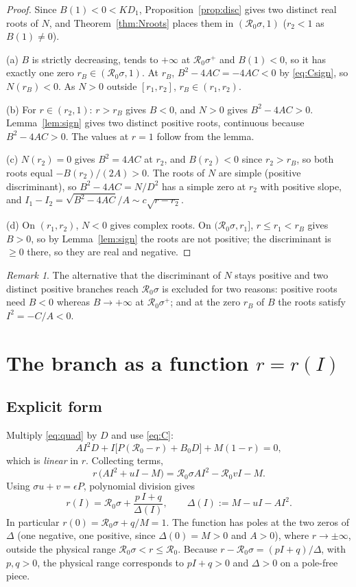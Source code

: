 \documentclass[11pt]{article}
\theoremstyle{remark}
\newtheorem{remark}[lemma]{Remark}
\newcommand{\R}{\mathcal R_0}
\begin{document}
\begin{proof}
Since $B(1)<0<KD_1$, Proposition~\ref{prop:disc} gives two distinct real roots of $N$, and Theorem~\ref{thm:Nroots} places them in $(\R\sigma,1)$ ($r_2<1$ as $B(1)\ne0$).

(a) $B$ is strictly decreasing, tends to $+\infty$ at $\R\sigma^+$ and $B(1)<0$, so it has exactly one zero $r_B\in(\R\sigma,1)$. At $r_B$, $B^2-4AC=-4AC<0$ by \eqref{eq:Csign}, so $N(r_B)<0$. As $N>0$ outside $[r_1,r_2]$, $r_B\in(r_1,r_2)$.

(b) For $r\in(r_2,1)$: $r>r_B$ gives $B<0$, and $N>0$ gives $B^2-4AC>0$. Lemma~\ref{lem:sign} gives two distinct positive roots, continuous because $B^2-4AC>0$. The values at $r=1$ follow from the lemma.

(c) $N(r_2)=0$ gives $B^2=4AC$ at $r_2$, and $B(r_2)<0$ since $r_2>r_B$, so both roots equal $-B(r_2)/(2A)>0$. The roots of $N$ are simple (positive discriminant), so $B^2-4AC=N/D^2$ has a simple zero at $r_2$ with positive slope, and $I_1-I_2=\sqrt{B^2-4AC}/A\sim c\sqrt{r-r_2}$.

(d) On $(r_1,r_2)$, $N<0$ gives complex roots. On $(\R\sigma,r_1]$, $r\le r_1<r_B$ gives $B>0$, so by Lemma~\ref{lem:sign} the roots are not positive; the discriminant is $\ge0$ there, so they are real and negative.
\end{proof}

\begin{remark}
The alternative that the discriminant of $N$ stays positive and two distinct positive branches reach $\R\sigma$ is excluded for two reasons: positive roots need $B<0$ whereas $B\to+\infty$ at $\R\sigma^+$; and at the zero $r_B$ of $B$ the roots satisfy $I^2=-C/A<0$.
\end{remark}

\section{The branch as a function $r=r(I)$}\label{sec:rI}

\subsection{Explicit form}

Multiply \eqref{eq:quad} by $D$ and use \eqref{eq:C}:
\[
AI^2D+I\big[P(\R-r)+B_0D\big]+M(1-r)=0 ,
\]
which is \emph{linear} in $r$. Collecting terms,
\[
r\,\big(AI^2+uI-M\big)=\R\sigma A I^2-\R vI-M .
\]
Using $\sigma u+v=\epsilon P$, polynomial division gives
\begin{equation}
r(I)=\R\sigma+\frac{p\,I+q}{\Delta(I)},\qquad \Delta(I):=M-uI-AI^2 .
\label{eq:rI}
\end{equation}
In particular $r(0)=\R\sigma+q/M=1$. The function has poles at the two zeros of $\Delta$ (one negative, one positive, since $\Delta(0)=M>0$ and $A>0$), where $r\to\pm\infty$, outside the physical range $\R\sigma<r\le\R$. Because $r-\R\sigma=(pI+q)/\Delta$, with $p,q>0$, the physical range corresponds to $pI+q>0$ and $\Delta>0$ on a pole-free piece.
\end{document}
